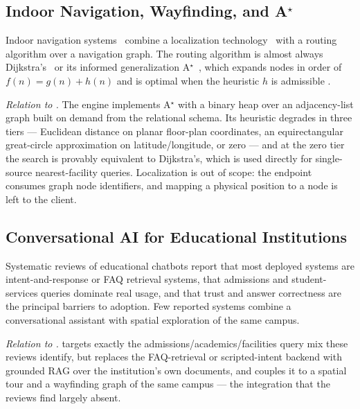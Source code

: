 \subsection{Indoor Navigation, Wayfinding, and A$^{\star}$}
Indoor navigation systems~\cite{fallah2013indoor} combine a localization
technology~\cite{zafari2019localization} with a routing algorithm over a
navigation graph. The routing algorithm is almost always
Dijkstra's~\cite{dijkstra1959note} or its informed generalization
A$^{\star}$~\cite{hart1968astar}, which expands nodes in order of
$f(n)=g(n)+h(n)$ and is optimal when the heuristic $h$ is admissible
\cite{russell2020aima}.

\emph{Relation to \system{}.} The engine implements A$^{\star}$ with a
binary heap over an adjacency-list graph built on demand from the
relational schema. Its heuristic degrades in three tiers --- Euclidean
distance on planar floor-plan coordinates, an equirectangular great-circle
approximation on latitude/longitude, or zero --- and at the zero tier the
search is provably equivalent to Dijkstra's, which is used directly for
single-source nearest-facility queries. Localization is out of scope: the
endpoint consumes graph node identifiers, and mapping a physical position
to a node is left to the client.

\subsection{Conversational AI for Educational Institutions}
Systematic reviews of educational chatbots
\cite{okonkwo2021chatbots,perez2020chatbots,winkler2018chatbots} report
that most deployed systems are intent-and-response or FAQ retrieval
systems, that admissions and student-services queries dominate real usage,
and that trust and answer correctness are the principal barriers to
adoption. Few reported systems combine a conversational assistant with
spatial exploration of the same campus.

\emph{Relation to \system{}.} \system{} targets exactly the
admissions/academics/facilities query mix these reviews identify, but
replaces the FAQ-retrieval or scripted-intent backend with grounded RAG
over the institution's own documents, and couples it to a spatial tour and
a wayfinding graph of the same campus --- the integration that the reviews
find largely absent.


